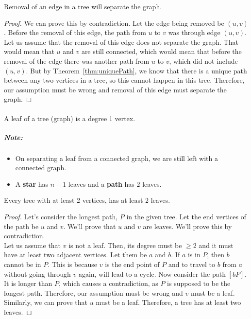 \documentclass{article}
\begin{document}
\begin{corollary}
    Removal of an edge in a tree will separate the graph.
    \begin{proof}
        We can prove this by contradiction. Let the edge being removed be $(u,v)$. Before the removal of this edge, the path from $u$ to $v$ was through edge $(u,v)$. Let us assume that the removal of this edge does not separate the graph. That would mean that $u$ and $v$ are still connected, which would mean that before the removal of the edge there was another path from $u$ to $v$, which did not include $(u,v)$. But by Theorem~\ref{thm:uniquePath}, we know that there is a unique path between any two vertices in a tree, so this cannot happen in this tree. Therefore, our assumption must be wrong and removal of this edge must separate the graph.
    \end{proof}
\end{corollary}

\paragraph*{}
\begin{definition}
A leaf of a tree (graph) is a degree 1 vertex.
\end{definition}

\subparagraph{Note:}
\begin{itemize}
    \item On separating a leaf from a connected graph, we are still left with a connected graph.
    \item A \textbf{star} has $n-1$ leaves and a \textbf{path} has $2$ leaves.
\end{itemize}

\begin{theorem}
    Every tree with at least 2 vertices, has at least 2 leaves.
    \begin{proof}
        Let's consider the longest path, $P$ in the given tree. Let the end vertices of the path be $u$ and $v$. We'll prove that $u$ and $v$ are leaves. We'll prove this by contradiction.\\
        Let us assume that $v$ is not a leaf. Then, its degree must be $\geq 2$ and it must have at least two adjacent vertices. Let them be $a$ and $b$. If $a$ is in $P$, then $b$ cannot be in $P$. This is because $v$ is the end point of $P$ and to travel to $b$ from $a$ without going through $v$ again, will lead to a cycle. Now consider the path $[b P]$. It is longer than $P$, which causes a contradiction, as $P$ is supposed to be the longest path. Therefore, our assumption must be wrong and $v$ must be a leaf. Similarly, we can prove that $u$ must be a leaf. Therefore, a tree has at least two leaves.
    \end{proof}
\end{theorem}
\end{document}
